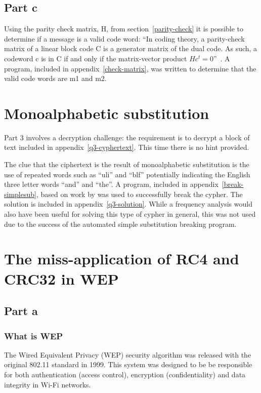 \documentclass[pdftex, 11pt, a4paper]{article}
\begin{document}
\subsection{Part c}
Using the parity check matrix, H, from section~\ref{parity-check} it is possible to determine if a message is a valid code word: ``In coding theory, a parity-check matrix of a linear block code C is a generator matrix of the dual code. As such, a codeword c is in C if and only if the matrix-vector product $Hc^t = 0$''~\cite{check-matrix}. A program, included in appendix~\ref{check-matrix}, was written to determine that the valid code words are m1 and m2.

\section{Monoalphabetic substitution}\label{mono}
Part 3 involves a decryption challenge: the requirement is to decrypt a block of text included in appendix~\ref{q3-cyphertext}. This time there is no hint provided.

The clue that the ciphertext is the result of monoalphabetic substitution is the use of repeated words such as ``uli'' and ``blf'' potentially indicating the English three letter words ``and'' and ``the''. A program, included in appendix~\ref{break-simplesub}, based on work by \textcite{stochastic-searching} was used to successfully break the cypher. The solution is included in appendix~\ref{q3-solution}. While a frequency analysis would also have been useful for solving this type of cypher in general, this was not used due to the success of the automated simple substitution breaking program.

\section{The miss-application of RC4 and CRC32 in WEP}\label{conclusions}

\subsection{Part a}
\subsubsection{What is WEP}
The Wired Equivalent Privacy (WEP) security algorithm was released with the original 802.11 standard in 1999\cite{802.11}. This system was designed to be be responsible for both authentication (access control), encryption (confidentiality) and data integrity in Wi-Fi networks.
\end{document}
